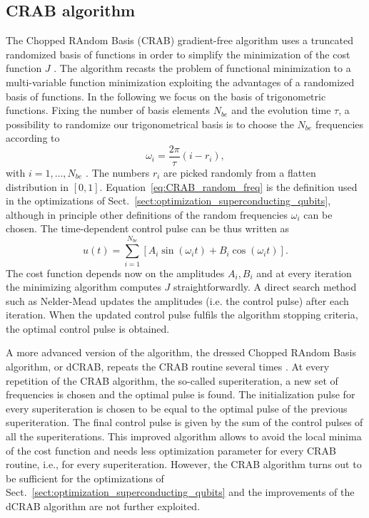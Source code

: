 \documentclass[../main/main.tex]{subfiles}
\begin{document}
\subsection{CRAB algorithm} \label{sect:CRAB}
The Chopped RAndom Basis (CRAB) gradient-free algorithm uses a truncated randomized basis of functions in order to simplify the minimization of the cost function $J$ \cite{Caneva_2011,optimal_control_NV_centers}. The algorithm recasts the problem of functional minimization to a multi-variable function minimization exploiting the advantages of a randomized basis of functions. In the following we focus on the basis of trigonometric functions. Fixing the number of basis elements $N_{be}$ and the evolution time $\tau$, a possibility to randomize our trigonometrical basis is to choose the $N_{be}$ frequencies according to
\begin{equation} \label{eq:CRAB_random_freq}
    \omega_i = \frac{2 \pi}{\tau} \left( i - r_i \right),
\end{equation}
with $i=1,\dots,N_{be}$ \cite{optimal_control_NV_centers}. The numbers $r_i$ are picked randomly from a flatten distribution in $[0,1]$. Equation~\eqref{eq:CRAB_random_freq} is  the definition used in the optimizations of Sect.~\ref{sect:optimization_superconducting_qubits}, although in principle other definitions of the random frequencies $\omega_i$ can be chosen. The time-dependent control pulse can be thus written as
\begin{equation} \label{eq:CRAB_control_pulse}
    u(t) = \sum_{i=1}^{N_{be}} \left[ A_i \sin(\omega_i t) + B_i \cos(\omega_i t) \right].
\end{equation}
The cost function depends now on the amplitudes $A_i,B_i$ and at every iteration the minimizing algorithm computes $J$ straightforwardly. A direct search method such as Nelder-Mead \cite{nelder_mead_algorithm} updates the amplitudes (i.e. the control pulse) after each iteration. When the updated control pulse fulfils the algorithm stopping criteria, the optimal control pulse is obtained. \par
A more advanced version of the algorithm, the dressed Chopped RAndom Basis algorithm, or dCRAB, repeats the CRAB routine several times \cite{Rach_2015_dCRAB}. At every repetition of the CRAB algorithm, the so-called superiteration, a new set of frequencies is chosen and the optimal pulse is found. The initialization pulse for every superiteration is chosen to be equal to the optimal pulse of the previous superiteration. The final control pulse is given by the sum of the control pulses of all the superiterations. This improved algorithm allows to avoid the local minima of the cost function and needs less optimization parameter for every CRAB routine, i.e., for every superiteration. However, the CRAB algorithm turns out to be sufficient for the optimizations of Sect.~\ref{sect:optimization_superconducting_qubits} and the improvements of the dCRAB algorithm are not further exploited.
\end{document}
